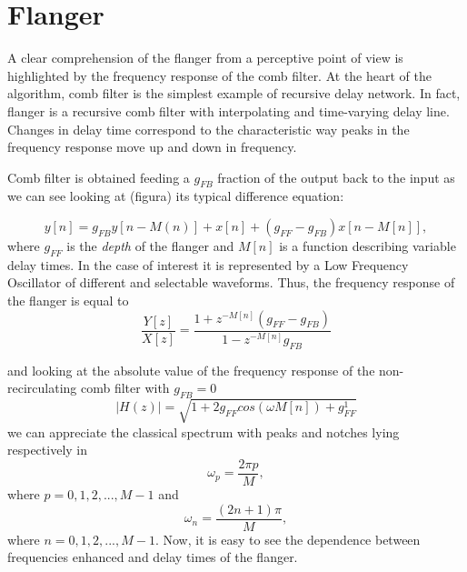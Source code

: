 \section{Flanger}
A clear comprehension of the flanger from a perceptive point of view  is highlighted by the frequency response of the comb filter. 
At the heart of the algorithm, comb filter is the simplest example of recursive delay network.
In fact, flanger is a recursive comb filter with interpolating and time-varying delay line. Changes in delay time correspond to the characteristic way peaks in the frequency response move up and down in frequency\cite{puckette2006theory}.

Comb filter is obtained feeding a $g_{FB}$ fraction of the output back to the input as we can see looking at (figura) its typical difference equation:

\[
	y[n] = g_{FB} y[n - M(n)] + x[n] + (g_{FF} - g_{FB}) x[n - M[n]],
\]
where $g_{FF}$ is the \textit{depth} of the flanger and $M[n]$ is a function describing variable delay times. In the case of interest it is represented by a Low Frequency Oscillator of different and selectable waveforms. Thus, the frequency response of the flanger is equal to 
\[
       \frac{Y[z]}{X[z]} = \frac{1 + z^{-M[n]} (g_{FF} - g_{FB})} {1 - z^{-M[n]}  g_{FB} }
\]

and looking at the absolute value of the frequency response of the non-recirculating comb filter with $g_{FB} = 0$ 
\[
    |H(z)| = \sqrt{ 1 + 2g_{FF} cos(\omega M[n]) + g_{FF}^1}
\]
 we can appreciate the classical spectrum with peaks and notches lying respectively in 
\[
       \omega_p = \frac{2 \pi p}{M},
\]
where $p = 0, 1, 2, ..., M-1$ and 
\[
       \omega_n = \frac{(2n+1) \pi}{M},
\]
where $n = 0, 1, 2, ..., M-1$. Now, it is easy to see the dependence between frequencies enhanced and delay times of the flanger. 